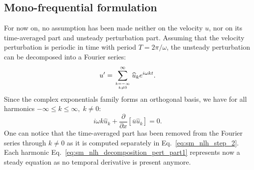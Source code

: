 \subsection{Mono-frequential formulation}
For now on, no assumption has been made neither on the velocity $u$,
nor on its time-averaged part and unsteady perturbation part.
Assuming that the velocity perturbation 
is periodic in time with period
$T=2 \pi / \omega$,
the unsteady perturbation can be decomposed into 
a Fourier series:
\begin{equation}
	u^\prime = \sum_{k=-\infty \atop k \neq 0}^{\infty} 
	\widehat{u}_k e^{i \omega k t}.
	\label{eq:sm_nlh_decomposition_pert}
\end{equation}
Since the complex exponentials family forms 
an orthogonal basis, we have for all harmonics 
$-\infty \leq k \leq \infty, \; k \neq 0$:
\begin{equation}
	i \omega k \widehat{u}_k + 
	\frac{\partial}{\partial x} \left[ \overline{u} \widehat{u}_k\right] =
	0.
	\label{eq:sm_nlh_decomposition_pert_part1}
\end{equation}
One can notice that the time-averaged part has been removed from
the Fourier series through $k \neq 0$ as it is computed 
separately in Eq.~\eqref{eq:sm_nlh_step_2}.
Each harmonic Eq.~\eqref{eq:sm_nlh_decomposition_pert_part1}
represents now a steady equation as no temporal
derivative is present anymore.

